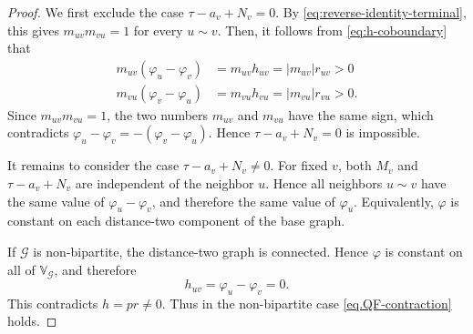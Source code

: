 \documentclass[11pt,twoside, a4paper]{article}
\numberwithin{equation}{section}
\numberwithin{figure}{section}
\theoremstyle{plain} %
\theoremstyle{definition}
\theoremstyle{remark}
\newcommand{\1} {\mspace{1 mu}}
\newcommand{\2} {\mspace{2 mu}}
\begin{document}
\begin{proof}
    We first exclude the case
    $
        \tau-a_v+N_v=0 .
    $
    By \eqref{eq:reverse-identity-terminal}, this gives
    $
        m_{uv}m_{vu}=1
    $
    for every $ u\sim v $.
    Then, it follows from \eqref{eq:h-coboundary} that
    \begin{align*}
        m_{uv}(\varphi_u-\varphi_v)&=m_{uv}h_{uv}=|m_{uv}|r_{uv}>0\\
        m_{vu}(\varphi_v-\varphi_u)&=m_{vu}h_{vu}=|m_{vu}|r_{vu}>0 .
    \end{align*}
    Since \(m_{uv}m_{vu}=1\), the two numbers \(m_{uv}\) and \(m_{vu}\) have the
    same sign, which contradicts \(\varphi_u-\varphi_v=-(\varphi_v-\varphi_u)\).  Hence $\tau-a_v+N_v=0$ is impossible.



    It remains to consider the case
    $
        \tau-a_v+N_v\ne0 .
    $
    For fixed \(v\), both \(M_v\) and \(\tau-a_v+N_v\) are independent of the
    neighbor \(u\).  Hence all neighbors \(u\sim v\) have the same value of
    \(\varphi_u-\varphi_v\), and therefore the same value of \(\varphi_u\).
    Equivalently, \(\varphi\) is constant on each distance-two component of the
    base graph.

    If \(\mathcal G\) is non-bipartite, the distance-two graph is
    connected.  Hence \(\varphi\) is constant on all of \(\mathbb{V}_{\mathcal G}\), and therefore
    \[
        h_{uv}=\varphi_u-\varphi_v=0 .
    \]
    This contradicts $h=pr\neq 0$.  Thus in the non-bipartite case \eqref{eq.QF-contraction} holds.


\end{proof}
\end{document}
